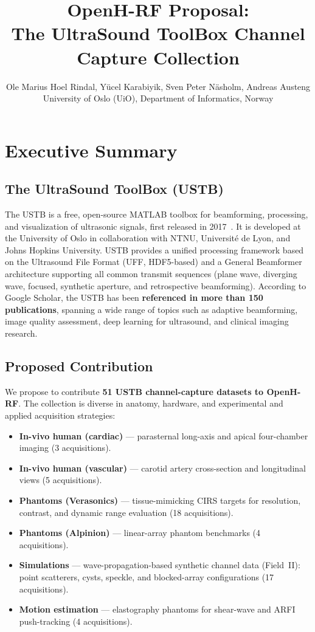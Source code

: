 \documentclass[11pt,a4paper]{article}
\title{\textbf{OpenH-RF Proposal:}\\[4pt]
The UltraSound ToolBox Channel Capture Collection}
\author{
  Ole Marius Hoel Rindal,
  Y\"ucel Karabiyik,
  Sven Peter N\"asholm,
  Andreas Austeng
  \\[4pt]
  University of Oslo (UiO), Department of Informatics, Norway
}
\date{}
\begin{document}
\maketitle
\thispagestyle{empty}

\section{Executive Summary}

\subsection*{The UltraSound ToolBox (USTB)}
The USTB is a free, open-source MATLAB toolbox for beamforming, processing, and visualization of ultrasonic signals, first released in 2017~\cite{rodriguez2017ustb}.
It is developed at the University of Oslo in collaboration with NTNU, Universit\'e de Lyon, and Johns Hopkins University.
USTB provides a unified processing framework based on the Ultrasound File Format (UFF, HDF5-based) and a General Beamformer architecture supporting all common transmit sequences (plane wave, diverging wave, focused, synthetic aperture, and retrospective beamforming).
According to Google Scholar, the USTB has been \textbf{referenced in more than 150 publications}, spanning a wide range of topics such as adaptive beamforming, image quality assessment, deep learning for ultrasound, and clinical imaging research.

\subsection*{Proposed Contribution}
We propose to contribute \textbf{51 USTB channel-capture datasets to OpenH-RF}.
The collection is diverse in anatomy, hardware, and experimental and applied acquisition strategies:
\begin{itemize}[nosep]
  \item[\textbf{A}] \textbf{In-vivo human (cardiac)} --- parasternal long-axis and apical four-chamber imaging (3 acquisitions).
  \item[\textbf{B}] \textbf{In-vivo human (vascular)} --- carotid artery cross-section and longitudinal views (5 acquisitions).
  \item[\textbf{C}] \textbf{Phantoms (Verasonics)} --- tissue-mimicking CIRS targets for resolution, contrast, and dynamic range evaluation (18 acquisitions).
  \item[\textbf{D}] \textbf{Phantoms (Alpinion)} --- linear-array phantom benchmarks (4 acquisitions).
  \item[\textbf{E}] \textbf{Simulations} --- wave-propagation-based synthetic channel data (Field~II): point scatterers, cysts, speckle, and blocked-array configurations (17 acquisitions).
  \item[\textbf{F}] \textbf{Motion estimation} --- elastography phantoms for shear-wave and ARFI push-tracking (4 acquisitions).
\end{itemize}
\end{document}
